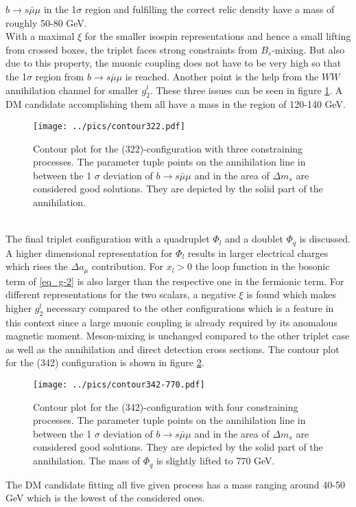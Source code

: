$b\rightarrow s\bar\mu\mu$ in the 1$\sigma$ region and fulfilling the correct relic density have a mass of roughly 50-80 GeV.\\
\noindent With a maximal $\xi$ for the smaller isospin representations and hence a small lifting from crossed boxes, the triplet faces strong
constraints from $B_s$-mixing. But also due to this property, the muonic coupling does not have to be very high so that the 1$\sigma$ region from
$b\rightarrow s\bar\mu\mu$ is reached. Another point is the help from the $WW$ annihilation channel for smaller $g_2^l$. These three issues can be
seen in figure \ref{pic_TriRes}. A DM candidate accomplishing them all have a mass in the region of 120-140 GeV.
\begin{figure}[t]
 \texttt{[image: ../pics/contour322.pdf]}
 \caption{Contour plot for the (322)-configuration with three constraining processes. The parameter tuple points on the annihilation line in between the 
 1 $\sigma$ deviation of $b\rightarrow s\bar\mu\mu$ and in the area of $\Delta m_s$ are considered good solutions. They are depicted by the solid
 part of the annihilation.}
 \label{pic_TriRes}
\end{figure}
\\
\noindent The final triplet configuration with a quadruplet $\Phi_l$ and a doublet $\Phi_q$ is discussed. A higher dimensional representation for 
$\Phi_l$ results in larger electrical charges which rises the $\Delta a_\mu$ contribution. For $x_l>0$ the loop function in the bosonic term of
\eqref{eq_g-2} is also larger than the respective one in the fermionic term. For different representations for the two scalars, a negative $\xi$
is found which makes higher $g_2^l$ necessary compared to the other configurations which is a feature in this context since a large muonic coupling
is already required by its anomalous magnetic moment. Meson-mixing is unchanged compared to the other triplet case as well as the annihilation 
and direct detection cross sections. The contour plot for the (342) configuration is shown in figure \ref{pic_Tri342Res}.
\begin{figure}[t]
 \texttt{[image: ../pics/contour342-770.pdf]}
 \caption{Contour plot for the (342)-configuration with four constraining processes. The parameter tuple points on the annihilation line in between 
 the 1 $\sigma$ deviation of $b\rightarrow s\bar\mu\mu$ and in the area of $\Delta m_s$ are considered good solutions. They are depicted by the solid
 part of the annihilation. The mass of $\Phi_q$ is slightly lifted to 770 GeV.}
 \label{pic_Tri342Res}
\end{figure}
The DM candidate fitting all five given process has a mass ranging around 40-50 GeV which is the lowest of the considered ones. 




